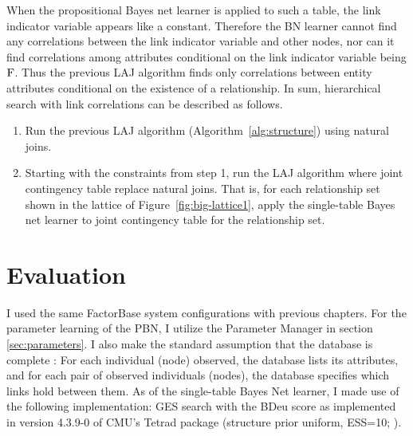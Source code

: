 \documentclass{sfuthesis}
\begin{document}
When the propositional Bayes net learner is applied to such a table, the link indicator variable appears like a constant. Therefore the BN learner cannot find any correlations between the link indicator variable and other nodes, nor can it find correlations among attributes conditional on the link indicator variable being $\mathrm{F}$. Thus the previous LAJ algorithm finds only correlations between entity attributes conditional on the existence of a relationship. In sum, hierarchical search with link correlations can be described as follows.
\begin{enumerate}
\item Run the previous LAJ algorithm (Algorithm~\ref{alg:structure}) using natural joins.
\item Starting with the constraints from step 1, run the LAJ algorithm where joint contingency table replace natural joins. That is, for each relationship set shown in the lattice of Figure~\ref{fig:big-lattice1}, apply the single-table Bayes net learner to joint contingency table for the relationship set.
\end{enumerate}



\section{Evaluation} \label{sec:eva}
I used the same FactorBase system configurations with previous chapters. For the parameter learning of the PBN, I utilize the Parameter Manager in section \ref{sec:parameters}. I also make the standard assumption that the database is complete \cite{Domingos2009,Khot2011}: For each individual (node) observed, the database lists its attributes, and for each pair of observed individuals (nodes), the database specifies which links hold between them. As of the single-table Bayes Net learner, I  made use of the following implementation:  GES search \cite{Chickering2003} with the BDeu score as implemented in version 4.3.9-0 of CMU's Tetrad package (structure prior uniform, ESS=10; \cite{2008a}).
\end{document}
